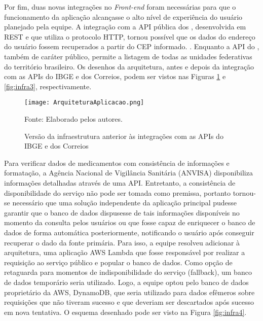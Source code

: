 \documentclass[
    12pt,               %
    openright,          %
    oneside,
    a4paper,            %
    BIBLATEX,           %
    TODO,               %
    english,            %
    brazil              %
    ]{ifsp-spo-inf-ctds}
\begin{document}
    Por fim, duas novas integrações no \emph{Front-end} foram necessárias para que o funcionamento da aplicação alcançasse o alto nível de experiência do usuário planejado pela equipe. A integração com a API pública dos , desenvolvida em REST e que utiliza o protocolo HTTP, tornou possível que os dados do endereço do usuário fossem recuperados a partir do CEP informado. . Enquanto a API do , também de caráter público, permite a listagem de todas as unidades federativas do território brasileiro.
    Os desenhos da arquitetura, antes e depois da integração com as APIs do IBGE e dos Correios, podem ser vistos nas Figuras \ref{fig:infra} e \ref{fig:infra3}, respectivamente.

    \begin{figure}[H]
        	\centering
            \caption{Versão da infraestrutura anterior às integrações com as APIs do IBGE e dos Correios}
            
        	\texttt{[image: ArquiteturaAplicacao.png]}
        	\label{fig:infra}
        	
        	\centering
            {\footnotesize Fonte: Elaborado pelos autores.}
   \end{figure}


    Para verificar dados de medicamentos com consistência de informações e formatação, a Agência Nacional de Vigilância Sanitária (ANVISA) disponibiliza informações detalhadas através de uma API.
    Entretanto, a consistência de disponibilidade do serviço não pode ser tomada como premissa, portanto tornou-se necessário que uma solução independente da aplicação principal pudesse garantir que o banco de dados dispusesse de tais informações disponíveis no momento da consulta pelos usuários ou que fosse capaz de enriquecer o banco de dados de forma automática posteriormente, notificando o usuário após conseguir recuperar o dado da fonte primária.
    Para isso, a equipe resolveu adicionar à arquitetura, uma aplicação AWS Lambda que fosse responsável por realizar a requisição ao serviço público e popular o banco de dados. Como opção de retaguarda para momentos de indisponibilidade do serviço (fallback), um banco de dados temporário seria utilizado. Logo, a equipe optou pelo banco de dados proprietário da AWS, DynamoDB, que seria utilizado para dados efêmeros sobre requisições que não tiveram sucesso e que deveriam ser descartados após sucesso em nova tentativa. O esquema desenhado pode ser visto na Figura \ref{fig:infra4}.
\end{document}
